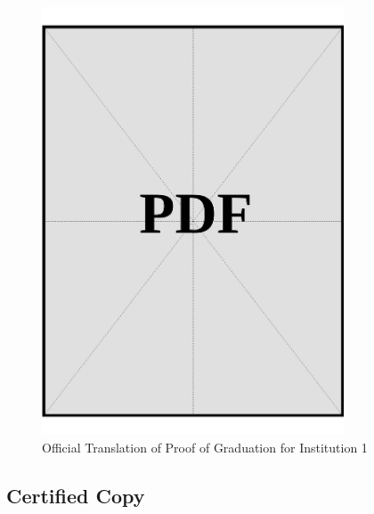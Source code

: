 \begin{figure}[h]
    \centering
    \includegraphics[page=1, width=0.8\textwidth]{../application-docs/applicant/post-secondary-institutions/institution-1/proof-of-graduation/official-translations.pdf}
    \caption{Official Translation of Proof of Graduation for Institution 1}
    \label{fig:institution-1-proof-of-graduation-official-translation}
\end{figure}

\vspace*{\fill}
\clearpage
\subsection*{Certified Copy}
\vspace*{\fill}

